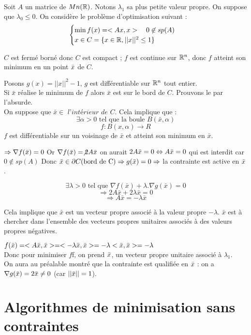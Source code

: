 \begin{exemple}

	Soit $A$ un matrice de $Mn(\mathbb{R})$. Notons $\lambda _1$ sa plus petite valeur propre. On suppose que $\lambda _0 \leq 0$. On considère le problème d'optimisation suivant : \[ \begin{cases}\min f(x) = <Ax, x> \quad 0 \not \in sp(A)\\ x \in C = \{ x \in \mathbb{R}, ||x||^2 \leq 1 \} \end{cases} \]
	
	$C$ est fermé borné donc $C$ est compact ;
	$f$ est continue sur $\mathbb{R}^n$, donc $f$ atteint son minimum en un point $\bar{x}$ de $C$.
	
	Posons $ g(x) = ||x||^2 - 1 $, $g$ est différentiable sur $\mathbb{R}^n$ tout entier.\\
Si $\bar{x}$ réalise le minimum de $f$ alors $\bar{x}$ est sur le bord de $C$. Prouvons le par l'absurde.\\
On suppose que $\bar{x} \in \textit{ l'intérieur de }C $.
Cela implique que : \[ \exists \alpha>0 \text{ tel que la boule } B(\bar{x},\alpha)  \]
\[ f : B(x,\alpha) \rightarrow R \]
$f$ est différentiable sur un voisinage de $\bar{x}$ et atteint son minimum en $\bar{x}$.
	
	$\Rightarrow \nabla f(\bar{x}) = 0$
	Or $\nabla f(\bar{x}) = \not 2A\bar{x}$
	on aurait $2A\bar{x} = 0 \Leftrightarrow A\bar{x} = 0$ qui est interdit car $0 \not \in sp(A)$
	Donc $\bar{x} \in \partial C \text{(bord de C)} \Rightarrow g(\bar{x}) = 0 \Rightarrow$ la contrainte est active en $\bar{x}$.
	
	\[ \exists \lambda > 0 \text{ tel que } \nabla f(\bar{x}) + \lambda.\nabla g(\bar{x}) = 0 \]
\[ \Rightarrow 2A\bar{x} + 2\lambda\bar{x} = 0 \]
\[ \Rightarrow A\bar{x} = - \lambda\bar{x}\]

Cela implique que $\bar{x}$ est un vecteur propre associé à la valeur propre $-\lambda$. $\bar{x}$ est à chercher dans l'ensemble des vecteurs propres unitaires associés à des valeurs propres négatives.
	
	$f(\bar{x}) = <A\bar{x}, \bar{x}> = <-\lambda \bar{x}, \bar{x}> = -\lambda <\bar{x}, \bar{x}> = - \lambda$ \\
	Donc pour minimiser $f$f, on prend $\bar{x}$, un vecteur propre unitaire associé à $\lambda_1$.\\
	On aura au préalable montré que la contrainte est qualifiée en $\bar{x}$ : on a $\nabla g(\bar{x}) = 2\bar{x} \ne 0$ (car $||\bar{x}||=1$).
	
\end{exemple}

\section{Algorithmes de minimisation sans contraintes}
